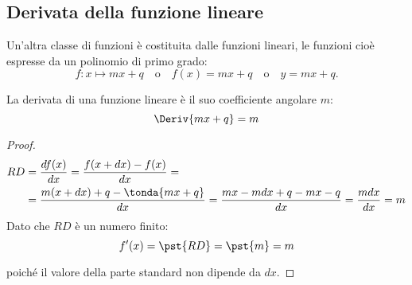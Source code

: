 % 
% 
% 

\subsection{Derivata della funzione lineare}
\label{subsec:differenziazione_derivataflineare}

Un'altra classe di funzioni è costituita dalle funzioni lineari, 
le funzioni cioè espresse da un polinomio di primo grado:
\[f: x \mapsto mx +q \quad \text{o} \quad   f(x)=mx +q \quad \text{o} \quad 
  y = mx +q.\]
\begin{teorema}
La derivata di una funzione lineare è il suo coefficiente angolare \(m\):
\[\Deriv{mx+q}=m\]
\end{teorema}
\begin{proof}
\begin{align*}
RD &=\dfrac{df(x)}{dx} =\dfrac{f(x+dx)-f(x)}{dx}=\\
               &=\dfrac{m(x+dx)+q-\tonda{mx+q}}{dx}=
                 \dfrac{mx-mdx+q-mx-q}{dx}=
                 \dfrac{mdx}{dx}=m
\end{align*}
Dato che \(RD\) è un numero finito:
\[f'(x) = \pst{RD}= \pst{m}=m\]

\vspace{-1em} \hspace{20mm} 
poiché il valore della parte standard non dipende da \(dx\).
\end{proof}

